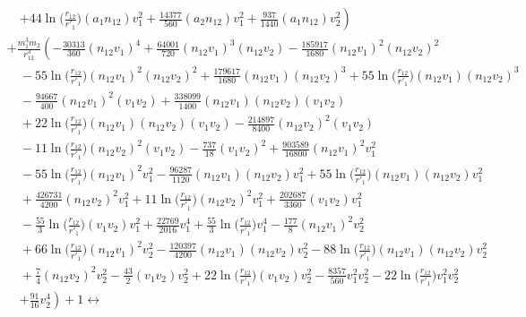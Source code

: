 \documentclass[prd,preprint,superscriptaddress,tightenlines,nofootinbib,
  eqsecnum,showpacs]{revtex4}
\begin{document}
{\begin{subequations}
\begin{align}
&\quad \left. + 44 \ln\Big(\frac{r_{12}}{r'_{1}}\Big) (a_1 n_{12}) v_1^{2}
 + \frac{14377}{560} (a_2 n_{12}) v_1^{2}
 + \frac{937}{1440} (a_1 n_{12}) v_2^{2}\right)\nonumber\\
& + \frac{m_{1}^3 m_{2}}{r_{12}^{3}} \left(- \frac{30313}{360} (n_{12} v_1)^4
 + \frac{64001}{720} (n_{12} v_1)^3 (n_{12} v_2)
 -  \frac{185917}{1680} (n_{12} v_1)^2 (n_{12} v_2)^2\right.\nonumber\\
& \quad - 55 \ln\Big(\frac{r_{12}}{r'_{1}}\Big) (n_{12} v_1)^2 (n_{12} v_2)^2
 + \frac{179617}{1680} (n_{12} v_1) (n_{12} v_2)^3
 + 55 \ln\Big(\frac{r_{12}}{r'_{1}}\Big) (n_{12} v_1) (n_{12} v_2)^3\nonumber\\
& \quad -  \frac{94667}{400} (n_{12} v_1)^2 (v_1 v_2)
 + \frac{338099}{1400} (n_{12} v_1) (n_{12} v_2) (v_1 v_2)\nonumber\\
& \quad + 22 \ln\Big(\frac{r_{12}}{r'_{1}}\Big) (n_{12} v_1) (n_{12} v_2) (v_1 v_2)
 -  \frac{214897}{8400} (n_{12} v_2)^2 (v_1 v_2)\nonumber\\
& \quad - 11 \ln\Big(\frac{r_{12}}{r'_{1}}\Big) (n_{12} v_2)^2 (v_1 v_2)
 -  \frac{737}{18} (v_1 v_2)^2
 + \frac{903589}{16800} (n_{12} v_1)^2 v_1^{2}\nonumber\\
& \quad - 55 \ln\Big(\frac{r_{12}}{r'_{1}}\Big) (n_{12} v_1)^2 v_1^{2}
 -  \frac{96287}{1120} (n_{12} v_1) (n_{12} v_2) v_1^{2}
 + 55 \ln\Big(\frac{r_{12}}{r'_{1}}\Big) (n_{12} v_1) (n_{12} v_2) v_1^{2}\nonumber\\
& \quad + \frac{426731}{4200} (n_{12} v_2)^2 v_1^{2}
 + 11 \ln\Big(\frac{r_{12}}{r'_{1}}\Big) (n_{12} v_2)^2 v_1^{2}
 + \frac{202687}{3360} (v_1 v_2) v_1^{2}\nonumber\\
& \quad -  \frac{55}{3} \ln\Big(\frac{r_{12}}{r'_{1}}\Big) (v_1 v_2) v_1^{2}
 + \frac{22769}{2016} v_1^{4}
 + \frac{55}{3} \ln\Big(\frac{r_{12}}{r'_{1}}\Big) v_1^{4}
 -  \frac{177}{8} (n_{12} v_1)^2 v_2^{2}\nonumber\\
& \quad + 66 \ln\Big(\frac{r_{12}}{r'_{1}}\Big) (n_{12} v_1)^2 v_2^{2}
 -  \frac{120397}{4200} (n_{12} v_1) (n_{12} v_2) v_2^{2}
 - 88 \ln\Big(\frac{r_{12}}{r'_{1}}\Big) (n_{12} v_1) (n_{12} v_2) v_2^{2}\nonumber\\
& \quad + \frac{7}{4} (n_{12} v_2)^2 v_2^{2}
 -  \frac{43}{2} (v_1 v_2) v_2^{2}
 + 22 \ln\Big(\frac{r_{12}}{r'_{1}}\Big) (v_1 v_2) v_2^{2}
 -  \frac{8357}{560} v_1^{2} v_2^{2}
 - 22 \ln\Big(\frac{r_{12}}{r'_{1}}\Big) v_1^{2} v_2^{2}\nonumber\\
&\quad \left. + \frac{91}{16} v_2^{4}\right)
 + 1 \leftrightarrow

\end{align}
\end{subequations}}
\end{document}

